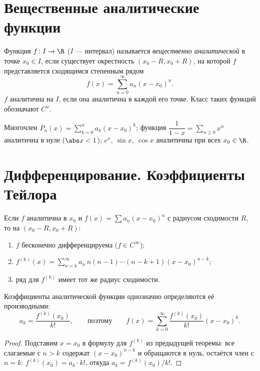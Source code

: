 \section{Вещественные аналитические функции}

\begin{definition}
Функция $f\colon I\to\R$ ($I$ — интервал) называется \emph{вещественно аналитической} в точке
$x_0\in I$, если существует окрестность $(x_0-R,x_0+R)$, на которой $f$ представляется сходящимся
степенным рядом
\[
  f(x)=\sum_{n=0}^\infty a_n(x-x_0)^n .
\]
$f$ аналитична на $I$, если она аналитична в каждой его точке. Класс таких функций обозначают
$C^{\omega}$.
\end{definition}

\begin{example}
Многочлен $P_n(x)=\sum_{k=0}^n a_k(x-x_0)^k$; функция $\dfrac1{1-x}=\sum_{n\ge0}x^n$ аналитична в
нуле ($\abs x<1$); $e^x,\ \sin x,\ \cos x$ аналитичны при всех $x_0\in\R$.
\end{example}

\section{Дифференцирование. Коэффициенты Тейлора}

\begin{theorem}
Если $f$ аналитична в $x_0$ и $f(x)=\sum a_n(x-x_0)^n$ с радиусом сходимости $R$, то на
$(x_0-R,x_0+R)$:
\begin{enumerate}[label=\arabic*),leftmargin=*]
  \item $f$ бесконечно дифференцируема ($f\in C^\infty$);
  \item $\displaystyle f^{(k)}(x)=\sum_{n=k}^\infty a_n\,n(n-1)\cdots(n-k+1)(x-x_0)^{n-k}$;
  \item ряд для $f^{(k)}$ имеет тот же радиус сходимости.
\end{enumerate}
\end{theorem}

\begin{theorem}
Коэффициенты аналитической функции однозначно определяются её производными:
\[
  a_k=\frac{f^{(k)}(x_0)}{k!},\qquad\text{поэтому}\qquad
  f(x)=\sum_{k=0}^\infty\frac{f^{(k)}(x_0)}{k!}(x-x_0)^k .
\]
\end{theorem}

\begin{proof}
Подставим $x=x_0$ в формулу для $f^{(k)}$ из предыдущей теоремы: все слагаемые с $n>k$ содержат
$(x-x_0)^{n-k}$ и обращаются в нуль, остаётся член с $n=k$:
$f^{(k)}(x_0)=a_k\cdot k!$, откуда $a_k=f^{(k)}(x_0)/k!$.
\end{proof}

